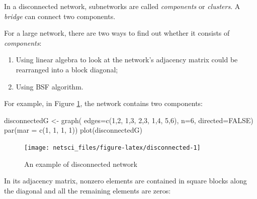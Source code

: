 \documentclass[
]{krantz}
\makeatletter
\newenvironment{Shaded}{\begin{snugshade}}{\end{snugshade}}
\newcommand{\AttributeTok}[1]{\textcolor[rgb]{0.61,0.61,0.61}{#1}}
\newcommand{\ConstantTok}[1]{\textcolor[rgb]{0,0,0}{#1}}
\newcommand{\DecValTok}[1]{\textcolor[rgb]{0.06,0.06,0.06}{#1}}
\newcommand{\FunctionTok}[1]{\textcolor[rgb]{0,0,0}{#1}}
\newcommand{\NormalTok}[1]{#1}
\newcommand{\OtherTok}[1]{\textcolor[rgb]{0.37,0.37,0.37}{#1}}
\newenvironment{kframe}{%
\medskip{}
\setlength{\fboxsep}{.8em}
 \def\at@end@of@kframe{}%
 \ifinner\ifhmode%
  \def\at@end@of@kframe{\end{minipage}}%
  \begin{minipage}{\columnwidth}%
 \fi\fi%
 \def\FrameCommand##1{\hskip\@totalleftmargin \hskip-\fboxsep
 \colorbox{shadecolor}{##1}\hskip-\fboxsep
     \hskip-\linewidth \hskip-\@totalleftmargin \hskip\columnwidth}%
 \MakeFramed {\advance\hsize-\width
   \@totalleftmargin\z@ \linewidth\hsize
   \@setminipage}}%
 {\par\unskip\endMakeFramed%
 \at@end@of@kframe}
\renewenvironment{Shaded}{\begin{kframe}}{\end{kframe}}
\makeatother
\begin{document}
In a disconnected network, subnetworks are called \emph{components} or \emph{clusters}. A \emph{bridge} can connect two components.

For a large network, there are two ways to find out whether it consists of \emph{components}:

\begin{enumerate}
\def\labelenumi{\arabic{enumi}.}
\item
  Using linear algebra to look at the network's adjacency matrix could be rearranged into a block diagonal;
\item
  Using BSF algorithm.
\end{enumerate}

For example, in Figure \ref{fig:disconnected}, the network contains two components:

\begin{Shaded}
\begin{Highlighting}[]
\NormalTok{disconnectedG }\OtherTok{\textless{}{-}} \FunctionTok{graph}\NormalTok{( }\AttributeTok{edges=}\FunctionTok{c}\NormalTok{(}\DecValTok{1}\NormalTok{,}\DecValTok{2}\NormalTok{, }\DecValTok{1}\NormalTok{,}\DecValTok{3}\NormalTok{, }\DecValTok{2}\NormalTok{,}\DecValTok{3}\NormalTok{, }\DecValTok{1}\NormalTok{,}\DecValTok{4}\NormalTok{, }\DecValTok{5}\NormalTok{,}\DecValTok{6}\NormalTok{), }
                        \AttributeTok{n=}\DecValTok{6}\NormalTok{, }
                        \AttributeTok{directed=}\ConstantTok{FALSE}\NormalTok{)}
\FunctionTok{par}\NormalTok{(}\AttributeTok{mar =} \FunctionTok{c}\NormalTok{(}\DecValTok{1}\NormalTok{, }\DecValTok{1}\NormalTok{, }\DecValTok{1}\NormalTok{, }\DecValTok{1}\NormalTok{))}
\FunctionTok{plot}\NormalTok{(disconnectedG)}
\end{Highlighting}
\end{Shaded}

\begin{figure}

{\centering \texttt{[image: netsci\_files/figure-latex/disconnected-1]} 

}

\caption{An example of disconnected network}\label{fig:disconnected}
\end{figure}

In its adjacency matrix, nonzero elements are contained in square blocks along the diagonal and all the remaining elements are zeros:
\end{document}
